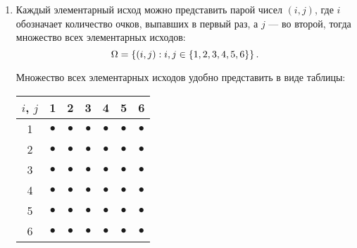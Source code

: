 \begin{enumerate}
    \item
    Каждый элементарный исход можно представить парой чисел $(i, j)$, где $i$ обозначает количество очков, выпавших в первый раз, а $j$ --- во второй, тогда множество всех элементарных
    исходов:
    \begin{equation}
        \Omega = \left \{ (i, j) : i, j \in \left \{ 1, 2, 3, 4, 5, 6 \right \} \right \}.
    \end{equation}

    Множество всех элементарных исходов удобно представить в виде таблицы:
    \begin{center}
        \begin{tabular}{c|c|c|c|c|c|c|}
            $i$, $j$ & 1         & 2         & 3         & 4         & 5         & 6         \\
            \hline
            1        & $\bullet$ & $\bullet$ & $\bullet$ & $\bullet$ & $\bullet$ & $\bullet$ \\
            \hline
            2        & $\bullet$ & $\bullet$ & $\bullet$ & $\bullet$ & $\bullet$ & $\bullet$ \\
            \hline
            3        & $\bullet$ & $\bullet$ & $\bullet$ & $\bullet$ & $\bullet$ & $\bullet$ \\
            \hline
            4        & $\bullet$ & $\bullet$ & $\bullet$ & $\bullet$ & $\bullet$ & $\bullet$ \\
            \hline
            5        & $\bullet$ & $\bullet$ & $\bullet$ & $\bullet$ & $\bullet$ & $\bullet$ \\
            \hline
            6        & $\bullet$ & $\bullet$ & $\bullet$ & $\bullet$ & $\bullet$ & $\bullet$ \\
            \hline
        \end{tabular}
    \end{center}


\end{enumerate}
